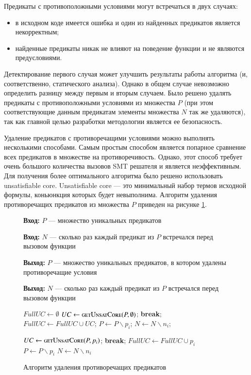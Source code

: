 Предикаты с противоположными условиями могут встречаться в двух случаях:
\begin{itemize}
\item в исходном коде имеется ошибка и один из найденных предикатов является некорректным;
\item найденные предикаты никак не влияют на поведение функции и не являются предусловиями.
\end{itemize}
Детектирование первого случая может улучшить результаты работы алгоритма (и, соответственно, статического анализа). Однако в общем случае невозможно определить разницу между первым и вторым случаем. Было решено удалять предикаты с противоположными условиями из множества $P$ (при этом соответствующие данным предикатам элементы множества $N$ так же удаляются), так как главной целью разработки методологии является ее безопасность.

Удаление предикатов с противоречащими условиями можно выполнять несколькими способами. Самым простым способом является попарное сравнение всех предикатов в множестве на противоречивость. Однако, этот способ требует очень большого количества вызовов SMT решателя и является неэффективным. Для получения более оптимального алгоритма было решено использовать unsatisfiable core. Unsatisfiable core\cite{unsatcore} --- это минимальный набор термов исходной формулы, коньюнкция которых будет невыполнима.  Алгоритм удаления противоречащих предикатов из  множества $P$ приведен на рисунке \ref{image:deletingAlgoritm}.
\begin{figure}[h!]
\textbf{Вход:} $P$ --- множество уникальных предикатов

\textbf{Вход:} $N$ --- сколько раз каждый предикат из $P$ встречался перед вызовом функции

\textbf{Выход:} $P$ --- множество уникальных предикатов, в котором удалены противоречащие условия

\textbf{Выход:} $N$ --- сколько раз каждый предикат из $P$ встречался перед вызовом функции

\begin{algorithmic}[1]
\State $FullUC \leftarrow \emptyset$
	\State $UC \leftarrow \Call{getUnsatCore}{P, \emptyset}$;
		\State \textbf{break};
	\EndIf
	\State $FullUC \leftarrow FullUC \cup UC$;
		\State $P \leftarrow P \backslash p_i$;
		\State $N \leftarrow N \backslash n_i$;
	\EndFor
\EndWhile

		\State $UC \leftarrow \Call{getUnsatCore}{P, p_i}$;
			\State \textbf{break};
		\EndIf
				\State $FullUC \leftarrow FullUC \cup p_i$
				\State $P \leftarrow P \backslash p_i$
				\State $N \leftarrow N \backslash n_i$
			\EndIf
		\EndFor
	\EndFor
\EndWhile
\end{algorithmic}
\caption{Алгоритм удаления противоречащих предикатов}
\label{image:deletingAlgoritm}
\end{figure}

